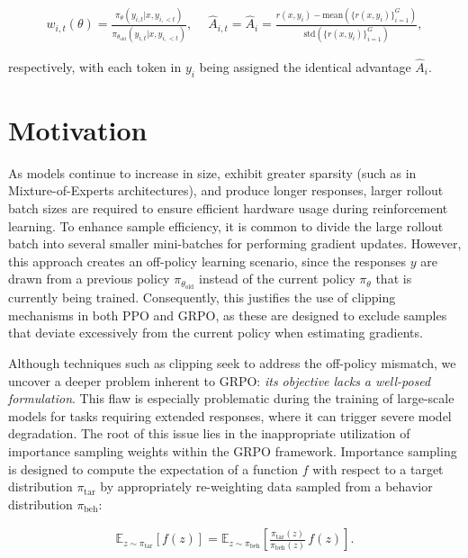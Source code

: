 \begin{align}
    w_{i,t}(\theta)=\frac{ \pi_{\theta} (y_{i,t} | x, y_{i,<t}) }{ \pi_{\theta_\text{old}} (y_{i,t} | x,y_{i,<t})},\quad\ 
    \widehat{A}_{i,t} = \widehat{A}_{i} = \frac{r(x, y_i) - \mathrm{mean} \left( \{ r(x, y_i) \}_{i=1}^G \right) }{ \mathrm{std} \left( \{ r(x, y_i) \}_{i=1}^G \right) },
\end{align}

respectively, with each token in $y_i$ being assigned the identical advantage $\widehat{A}_{i}$.

\section{Motivation}
\label{sec:motivation}

As models continue to increase in size, exhibit greater sparsity (such as in Mixture-of-Experts architectures), and produce longer responses, larger rollout batch sizes are required to ensure efficient hardware usage during reinforcement learning. To enhance sample efficiency, it is common to divide the large rollout batch into several smaller mini-batches for performing gradient updates. However, this approach creates an off-policy learning scenario, since the responses $y$ are drawn from a previous policy $\pi_{\theta_\text{old}}$ instead of the current policy $\pi_\theta$ that is currently being trained. Consequently, this justifies the use of clipping mechanisms in both PPO and GRPO, as these are designed to exclude samples that deviate excessively from the current policy when estimating gradients.

Although techniques such as clipping seek to address the off-policy mismatch, we uncover a deeper problem inherent to GRPO: \textit{its objective lacks a well-posed formulation}. This flaw is especially problematic during the training of large-scale models for tasks requiring extended responses, where it can trigger severe model degradation. The root of this issue lies in the inappropriate utilization of importance sampling weights within the GRPO framework. Importance sampling is designed to compute the expectation of a function $f$ with respect to a target distribution $\pi_\text{tar}$ by appropriately re-weighting data sampled from a behavior distribution $\pi_\text{beh}$:

\begin{align}
\mathbb{E}_{z \sim \pi_\text{tar}} \left[ f(z) \right] = \mathbb{E}_{z \sim \pi_\text{beh}} \left[ \frac{ \pi_\text{tar} (z) }{ \pi_\text{beh} (z)} \, f(z) \right].
\end{align}

